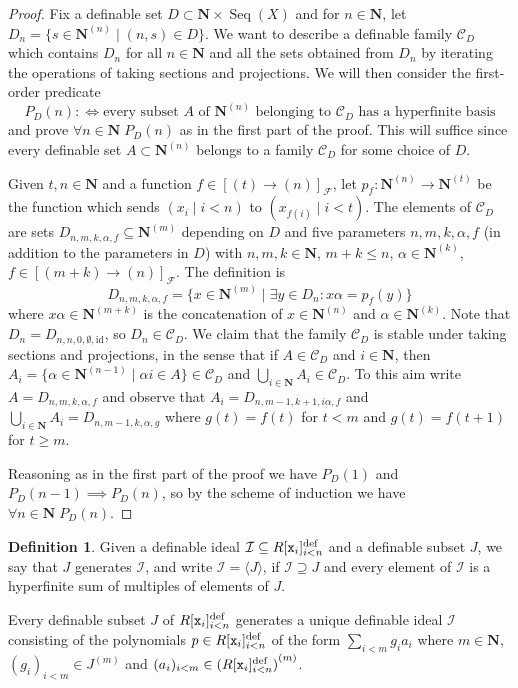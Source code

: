 \documentclass{amsart}
\newcommand{\ca}{\mathcal}
\newcommand{\ideal}[1]{\ca #1}
\newcommand{\Seq}{\operatorname{Seq}}
\theoremstyle{plain}
\theoremstyle{definition}
\newtheorem{defn}[thm]{Definition}
\newcommand{\F}{\mathcal{F}}
\newcommand{\hn}{\mathbf N}
\newcommand{\fun}[2]{[#1 \to #2]_{\F}}
\newcommand{\polyn}[2]{{#1}[{\tt x}_i]_{i<#2}^\text{def}}
\begin{document}
\begin{proof}
Fix a definable set $D \subset \hn \times \Seq(X)$ and for $n\in \hn$, let $D_n = \{s\in \hn^{(n)} \mid (n,s) \in D\}$. 
We want to describe a definable family $\ca C_D$ which contains $D_n$ for all $n\in \hn$ and all the sets obtained from $D_n$ by iterating the operations of taking sections and projections. We will then consider the first-order predicate
$$P_D(n) :\iff \text{every subset $A$ of $\hn^{(n)}$ belonging to $\ca C_D$ has a hyperfinite basis}$$ 
and prove $\forall n\in \hn \; P_D(n)$ as in the first part of the proof. This will suffice since every definable set $A \subset \hn^{(n)}$ belongs to a family $\ca C_D$ for some choice of $D$. 


Given $t, n \in \hn$ and a function $f\in \fun {(t)} {(n)}$, let $p_f:\hn^{(n)}\to \hn^{(t)}$ be the function which sends $(x_i\mid i<n)$ to $(x_{f(i)} \mid i <t)$.  
The elements of $\ca C_D$ are sets $D_{n,m,k,\alpha,f} \subseteq \hn^{(m)}$ depending on $D$ and five parameters $n,m,k,\alpha,f$ (in addition to the parameters in $D$) with $n,m,k\in \hn$, $m+k\leq n$, $\alpha \in \hn^{(k)}$, $f\in \fun {(m+k)} {(n)}$. The definition is
%
$$D_{n,m,k,\alpha, f} = \{x\in \hn^{(m)} \mid \exists y \in D_n  : x\alpha = p_f(y)\}$$
%
where $x\alpha \in \hn^{(m+k)}$ is the concatenation of $x \in \hn^{(n)}$ and $\alpha\in \hn^{(k)}$.  
Note that $D_n = D_{n,n,0,\emptyset, \text{id}}$, so $D_n \in \ca C_D$. We claim that the family $\ca C_D$ is stable under taking sections and projections, in the sense that if $A\in \ca C_D$ and $i\in \hn$, then $A_i = \{\alpha \in \hn^{(n-1)} \mid \alpha i \in A\} \in \ca C_D$ and $\bigcup_{i\in \hn}A_i \in \ca C_D$. To this aim write $A = D_{n,m,k,\alpha,f}$ and observe that $A_i = D_{n,m-1,k+1,i\alpha, f}$ and $\bigcup_{i\in \hn} A_i = D_{n,m-1, k, \alpha, g}$ where $g(t) = f(t)$ for $t<m$ and $g(t) = f(t+1)$ for $t\geq m$.  

 Reasoning as in the first part of the proof we have $P_D(1)$ and $P_D(n-1)\implies P_D(n)$, so by the scheme of induction we have $\forall n \in \hn \; P_D(n)$. \end{proof}

\begin{defn}  
Given a definable ideal $\ideal I\subseteq \polyn R n$ and a definable subset $J$, we say that $J$ generates $\ideal I$, and write $\ideal I = \langle J \rangle$, if $\ideal I\supseteq J$ and every element of $\ideal I$ is a hyperfinite sum of multiples of elements of $J$. 
\end{defn}

Every definable subset $J$ of $\polyn R n$ generates a unique definable ideal $\ideal I$ consisting of the polynomials $p\in \polyn R n$ of the form $\sum_{i<m} g_i a_i$ where $m\in \hn$,  $(g_i)_{i<m}\in J^{(m)}$ and $(a_i)_{i<m} \in {(\polyn R n)}^{(m)}$. 
\end{document}
